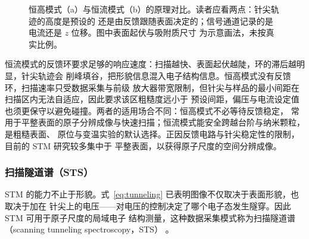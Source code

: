 \begin{figure}[htbp]
\caption{恒高模式（a）与恒流模式（b）的原理对比。读者应看两点：针尖轨迹的高度是预设的
还是由反馈跟随表面决定的；信号通道记录的是电流还是 $z$ 位移。图中表面起伏与吸附质尺寸
为示意画法，未按真实比例。\schemamark{}}
\label{fig:stm-modes}
\end{figure}

\begin{measure}
恒流模式的反馈环要求足够的响应速度：扫描越快、表面起伏越陡，环的滞后越明显，针尖轨迹会
削峰填谷，把形貌信息混入电子结构信息。恒高模式没有反馈环，扫描速率只受数据采集与前级
放大器带宽限制，但针尖与样品的最小间距在扫描区内无法自适应，因此要求该区粗糙度远小于
预设间距，偏压与电流设定值也须更保守以避免碰撞。两者的适用场合不同：恒高模式不必等待反馈稳定，
常用于平整表面的原子分辨成像与快速扫描；恒流模式能安全跨越台阶与纳米颗粒，是粗糙表面、
原位与变温实验的默认选择。正因反馈电路与针尖稳定性的限制，目前的 STM 研究较多集中于
平整表面，以获得原子尺度的空间分辨成像。
\end{measure}

\subsubsection{扫描隧道谱（STS）}

STM 的能力不止于形貌。式~\eqref{eq:tunneling} 已表明图像不仅取决于表面形貌，也取决于加在
针尖上的电压——对电压的控制决定了哪个电子态发生隧穿。因此 STM 可用于原子尺度的局域电子
结构测量，这种数据采集模式称为扫描隧道谱（scanning tunneling spectroscopy，STS）
。

